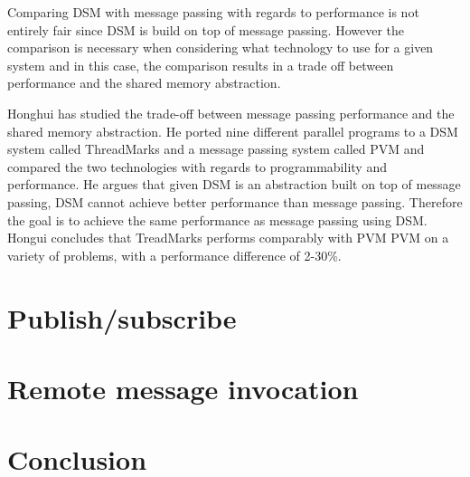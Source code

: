 Comparing DSM with message passing with regards to performance is not entirely fair since DSM is build on top of message passing. However the comparison is necessary when considering what technology to use for a given system and in this case, the comparison results in a trade off between performance and the shared memory abstraction. 

Honghui \cite{lu1995message} has studied the trade-off between message passing performance and the shared memory abstraction. He ported nine different parallel programs to a DSM system called ThreadMarks and a message passing system called PVM and compared the two technologies with regards to programmability and performance. He argues that given DSM is an abstraction built on top of message passing, DSM cannot achieve better performance than message passing. Therefore the goal is to achieve the same performance as message passing using DSM. Hongui concludes that TreadMarks performs comparably with PVM PVM on a variety of problems, with a performance difference of 2-30\%.





\section{Publish/subscribe}


\section{Remote message invocation}


\section{Conclusion}

